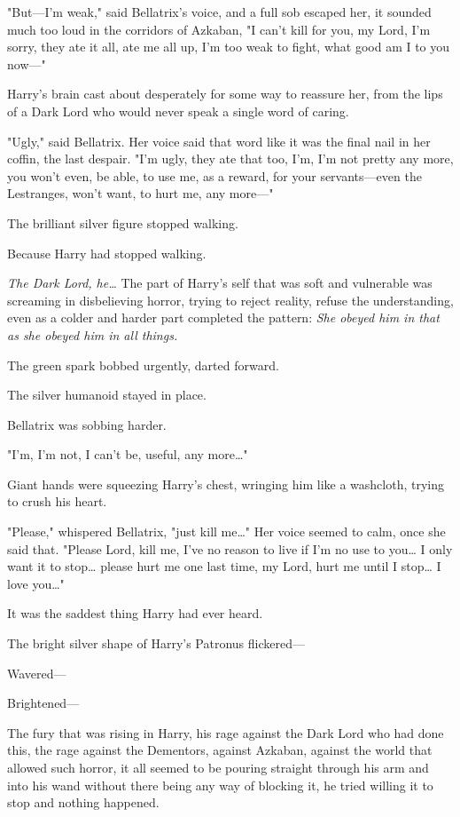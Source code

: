 "But---I'm weak," said Bellatrix's voice, and a full sob escaped her, it 
sounded much too loud in the corridors of Azkaban, "I can't kill for you, my 
Lord, I'm sorry, they ate it all, ate me all up, I'm too weak to fight, what 
good am I to you now---"

Harry's brain cast about desperately for some way to reassure her, from the 
lips of a Dark Lord who would never speak a single word of caring.

"Ugly," said Bellatrix. Her voice said that word like it was the final nail in 
her coffin, the last despair. "I'm ugly, they ate that too, I'm, I'm not pretty 
any more, you won't even, be able, to use me, as a reward, for your 
servants---even the Lestranges, won't want, to hurt me, any more---"

The brilliant silver figure stopped walking.

Because Harry had stopped walking.

\emph{The Dark Lord, he{\ldots}} The part of Harry's self that was soft and 
vulnerable was screaming in disbelieving horror, trying to reject reality, 
refuse the understanding, even as a colder and harder part completed the 
pattern: \emph{She obeyed him in that as she obeyed him in all things.}

The green spark bobbed urgently, darted forward.

The silver humanoid stayed in place.

Bellatrix was sobbing harder.

"I'm, I'm not, I can't be, useful, any more{\ldots}"

Giant hands were squeezing Harry's chest, wringing him like a washcloth, trying 
to crush his heart.

"Please," whispered Bellatrix, "just kill me{\ldots}" Her voice seemed to calm, 
once she said that. "Please Lord, kill me, I've no reason to live if I'm no use 
to you{\ldots} I only want it to stop{\ldots} please hurt me one last time, my 
Lord, hurt me until I stop{\ldots} I love you{\ldots}"

It was the saddest thing Harry had ever heard.

The bright silver shape of Harry's Patronus flickered---

Wavered---

Brightened---

The fury that was rising in Harry, his rage against the Dark Lord who had done 
this, the rage against the Dementors, against Azkaban, against the world that 
allowed such horror, it all seemed to be pouring straight through his arm and 
into his wand without there being any way of blocking it, he tried willing it 
to stop and nothing happened.

